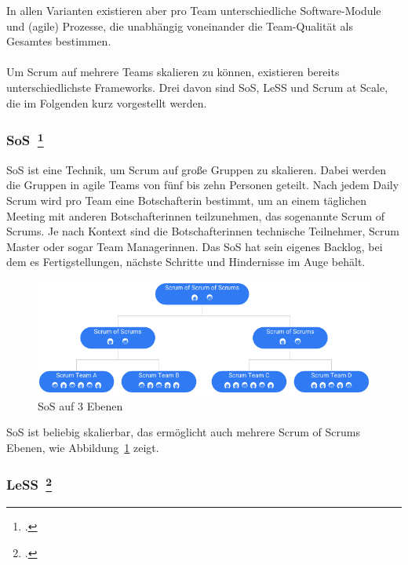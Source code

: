 In allen Varianten existieren aber pro Team unterschiedliche Software-Module und (agile) Prozesse, die unabhängig voneinander die Team-Qualität als Gesamtes bestimmen.
\\
\\
Um Scrum auf mehrere Teams skalieren zu können, existieren bereits unterschiedlichste Frameworks.
Drei davon sind \ac{SoS}, \ac{LeSS} und Scrum at Scale, die im Folgenden kurz vorgestellt werden.

\newpage
\subsubsection[\ac{SoS}]{\ac{SoS}~\footcite[vgl.][]{sos}}

\ac{SoS} ist eine Technik, um Scrum auf große Gruppen zu skalieren. 
Dabei werden die Gruppen in agile Teams von fünf bis zehn Personen geteilt.
Nach jedem Daily Scrum wird pro Team eine Botschafterin bestimmt, um an einem täglichen Meeting mit anderen Botschafterinnen teilzunehmen, das sogenannte Scrum of Scrums.
Je nach Kontext sind die Botschafterinnen technische Teilnehmer, Scrum Master oder sogar Team Managerinnen.
Das \ac{SoS} hat sein eigenes Backlog, bei dem es Fertigstellungen, nächste Schritte und Hindernisse im Auge behält.

\begin{savenotes}
  \begin{figure}[H] 
    \centering
       \includegraphics[width=1.0\textwidth]{img/sos.png}
    \caption{\ac{SoS} auf 3 Ebenen}\label{fig:sos}
  \end{figure}
\end{savenotes}

\ac{SoS} ist beliebig skalierbar, das ermöglicht auch mehrere Scrum of Scrums Ebenen, wie Abbildung~\ref{fig:sos} zeigt.

\subsubsection[\ac{LeSS}]{\ac{LeSS}~\footcite[vgl.][]{less}}

